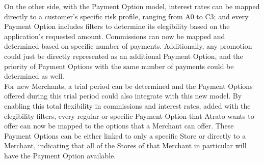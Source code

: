 On the other side, with the Payment Option model, interest rates can be mapped directly to a customer's specific risk profile, ranging from A0 to C3; and every Payment Option includes filters to determine its elegibility based on the application's requested amount. Commissions can now be mapped and determined based on specific number of payments. Additionally, any promotion could just be directly represented as an additional Payment Option, and the priority of Payment Options with the same number of payments could be determined as well.\\ 


For new Merchants, a trial period can be determined and the Payment Options offered during this trial period could also integrate with this new model. By enabling this total flexibility in commissions and interest rates, added with the elegibility filters, every regular or specific Payment Option that Atrato wants to offer can now be mapped to the options that a Merchant can offer. These Payment Options can be either linked to only a specific Store or directly to a Merchant, indicating that all of the Stores of that Merchant in particular will have the Payment Option available.